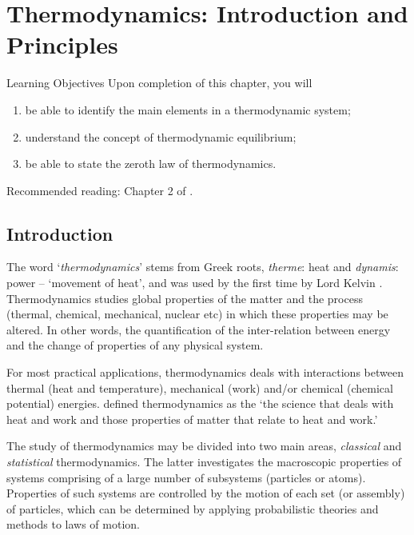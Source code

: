
\chapter{Thermodynamics: Introduction and Principles}\label{Chapter:Introduction}

   \begin{LearningObjectivesBlock}{Learning Objectives}
      Upon completion of this chapter, you will
        \begin{enumerate}
           \item be able to identify the main elements in a thermodynamic system;
           \item understand the concept of thermodynamic equilibrium;
           \item be able to state the zeroth law of thermodynamics.
        \end{enumerate}
\medskip
     Recommended reading: Chapter 2 of \citet{Atkins_Book,Devoe_Book,Borgnakke_Book}.
   \end{LearningObjectivesBlock}


   \section{Introduction}\label{Chapter:Introduction:Section:Introduction}

   The word `{\it thermodynamics}' stems from Greek roots, {\it therme}: heat and {\it dynamis}: power -- `movement of heat', and was used by the first time by Lord Kelvin \citep{Thomson_1849}. Thermodynamics studies global properties of the matter and the process (\eg thermal, chemical, mechanical, nuclear etc) in which these properties may be altered. In other words, the quantification of the inter-relation between energy and the change of properties of any physical system.

   For most practical applications, thermodynamics deals with interactions between thermal (\ie heat and temperature), mechanical (\ie work) and/or chemical (\ie chemical potential) energies. \citet{Borgnakke_Book} defined thermodynamics as the `the science that deals with heat and work and those properties of matter that relate to heat and work.'

   \medskip
   
   The study of thermodynamics may be divided into two main areas, {\it classical} and {\it statistical} thermodynamics. The latter investigates the macroscopic properties of systems comprising of a large number of subsystems (\ie particles or atoms). Properties of such systems are controlled by the motion of each set (or assembly) of particles, which can be determined by applying probabilistic theories and methods to laws of motion.

